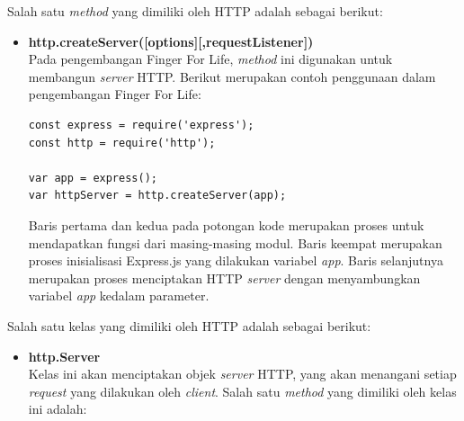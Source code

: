 \begin{enumerate}
\begin{enumerate}
		Salah satu \textit{method} yang dimiliki oleh HTTP adalah sebagai berikut:
		
		\begin{itemize}
			\item \textbf{http.createServer([options][,requestListener])} \\
			Pada pengembangan Finger For Life, \textit{method} ini digunakan untuk membangun \textit{server} HTTP. Berikut merupakan contoh penggunaan dalam pengembangan Finger For Life:
\begin{lstlisting}[caption={Contoh penggunaan \textit{method createServer(options[,requestListener])}}, label={lst:node_createServer}, captionpos=b]
const express = require('express');
const http = require('http');

var app = express();
var httpServer = http.createServer(app);
\end{lstlisting}

Baris pertama dan kedua pada potongan kode merupakan proses untuk mendapatkan fungsi dari masing-masing modul. Baris keempat merupakan proses inisialisasi Express.js yang dilakukan variabel \textit{app}. Baris selanjutnya merupakan proses menciptakan HTTP \textit{server} dengan menyambungkan variabel \textit{app} kedalam parameter.			
		\end{itemize}
	
		Salah satu kelas yang dimiliki oleh HTTP adalah sebagai berikut:
		\begin{itemize}
			\item \textbf{http.Server} \\
			Kelas ini akan menciptakan objek \textit{server} HTTP, yang akan menangani setiap \textit{request} yang dilakukan oleh \textit{client}. Salah satu \textit{method} yang dimiliki oleh kelas ini adalah:
			

\end{itemize}
\end{enumerate}
\end{enumerate}
